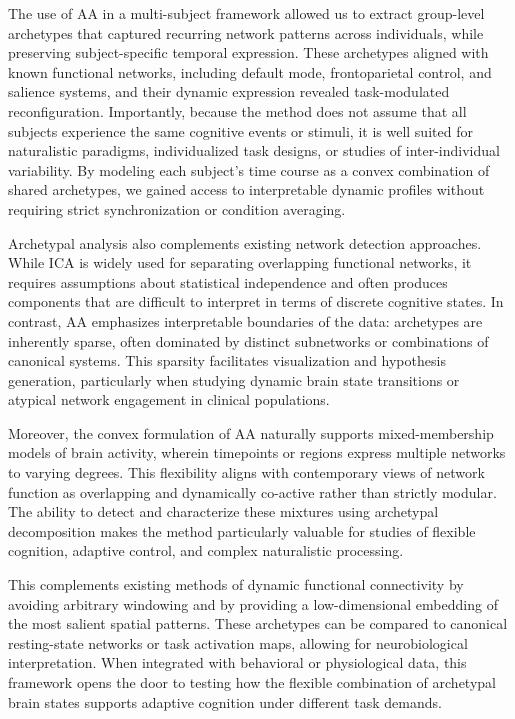 \documentclass[12pt]{article}
\begin{document}
The use of AA in a multi-subject framework allowed us to extract group-level archetypes that captured recurring network patterns across individuals, while preserving subject-specific temporal expression. These archetypes aligned with known functional networks, including default mode, frontoparietal control, and salience systems, and their dynamic expression revealed task-modulated reconfiguration. Importantly, because the method does not assume that all subjects experience the same cognitive events or stimuli, it is well suited for naturalistic paradigms, individualized task designs, or studies of inter-individual variability. By modeling each subject’s time course as a convex combination of shared archetypes, we gained access to interpretable dynamic profiles without requiring strict synchronization or condition averaging.

Archetypal analysis also complements existing network detection approaches. While ICA is widely used for separating overlapping functional networks, it requires assumptions about statistical independence and often produces components that are difficult to interpret in terms of discrete cognitive states. In contrast, AA emphasizes interpretable boundaries of the data: archetypes are inherently sparse, often dominated by distinct subnetworks or combinations of canonical systems. This sparsity facilitates visualization and hypothesis generation, particularly when studying dynamic brain state transitions or atypical network engagement in clinical populations.


Moreover, the convex formulation of AA naturally supports mixed-membership models of brain activity, wherein timepoints or regions express multiple networks to varying degrees. This flexibility aligns with contemporary views of network function as overlapping and dynamically co-active rather than strictly modular. The ability to detect and characterize these mixtures using archetypal decomposition makes the method particularly valuable for studies of flexible cognition, adaptive control, and complex naturalistic processing.

This complements existing methods of dynamic functional connectivity by avoiding arbitrary windowing and by providing a low-dimensional embedding of the most salient spatial patterns. These archetypes can be compared to canonical resting-state networks or task activation maps, allowing for neurobiological interpretation. When integrated with behavioral or physiological data, this framework opens the door to testing how the flexible combination of archetypal brain states supports adaptive cognition under different task demands.
\end{document}
